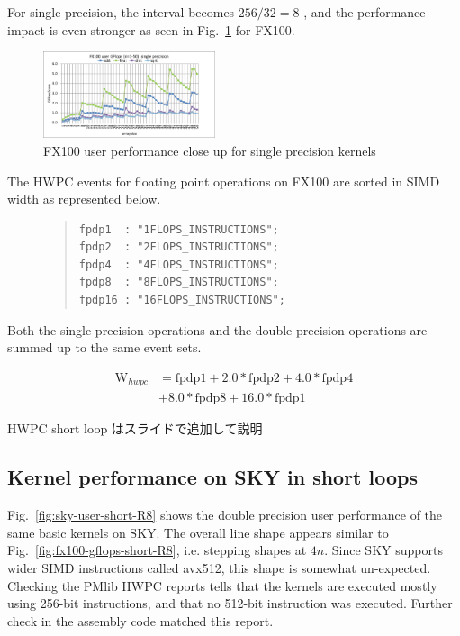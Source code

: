 \documentclass[conference]{IEEEtran}
\begin{document}
For single precision, the interval becomes
\begin{math}
256 / 32 = 8
\end{math}
, and the performance impact is even stronger as seen in
Fig.~\ref{fig:fx100-gflops-short-R4} for FX100.
\begin{figure}[tb]
\centering
\includegraphics[width=0.45\textwidth]{figs/fx100-gflops-short-R4.pdf}
\caption{FX100 user performance close up for single precision kernels}
\label{fig:fx100-gflops-short-R4}
\end{figure}

The HWPC events for floating point operations on FX100 are
sorted in SIMD width as represented below.
\begin{figure}[H]
\begin{quote}
\begin{small}
\begin{verbatim}
fpdp1  : "1FLOPS_INSTRUCTIONS";
fpdp2  : "2FLOPS_INSTRUCTIONS";
fpdp4  : "4FLOPS_INSTRUCTIONS";
fpdp8  : "8FLOPS_INSTRUCTIONS";
fpdp16 : "16FLOPS_INSTRUCTIONS";
\end{verbatim}
\end{small}
\end{quote}
\end{figure}
Both the single precision operations and the double precision operations are
summed up to the same event sets.

\begin{align}
	\mathrm{W}_{hwpc} & = \mathrm{fpdp1} + 2.0*\mathrm{fpdp2} + 4.0*\mathrm{fpdp4} \nonumber \\
			& + 8.0*\mathrm{fpdp8} + 16.0*\mathrm{fpdp1} 
\end{align}

{\color{blue} HWPC short loop はスライドで追加して説明}


{\color{blue}
\subsection{Kernel performance on SKY in short loops}
\label{subsection:short-kernels-sky}
}
Fig.~\ref{fig:sky-user-short-R8}
shows the double precision user performance of the same basic kernels on SKY.
The overall line shape appears similar to Fig.~\ref{fig:fx100-gflops-short-R8},
i.e.  stepping shapes at $ 4n $.
Since SKY supports wider SIMD instructions called avx512, this shape
is somewhat un-expected.
Checking the PMlib HWPC reports tells that the kernels are executed
mostly using 256-bit instructions, and that no 512-bit instruction was executed.
Further check in the assembly code matched this report.
\end{document}
